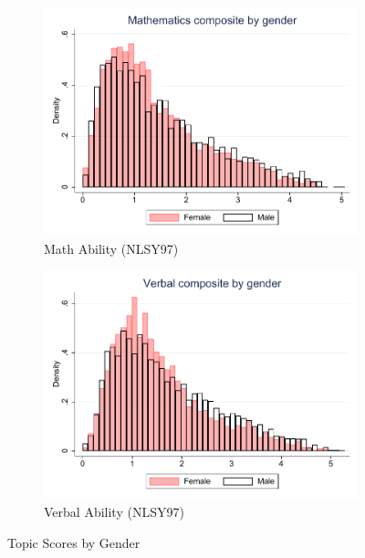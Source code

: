 \documentclass[onehalfspacing,11pt]{article}
\begin{document}
\begin{figure}
		\begin{subfigure}{0.49\textwidth}
		\includegraphics[width=\linewidth]{NLSY97_Mathematics_gender.pdf}
		\caption{Math Ability (NLSY97)} \label{fig:nlsy97math}
	\end{subfigure}
	\hspace*{\fill} %
	\begin{subfigure}{0.49\textwidth}
		\includegraphics[width=\linewidth]{NLSY97_Verbal_gender.pdf}
		\caption{Verbal Ability (NLSY97)} \label{fig:nlsy97wprd}
	\end{subfigure}

	\caption{Topic Scores by Gender}
	\label{fig:nlsy_by_gender}
\end{figure}
\end{document}
